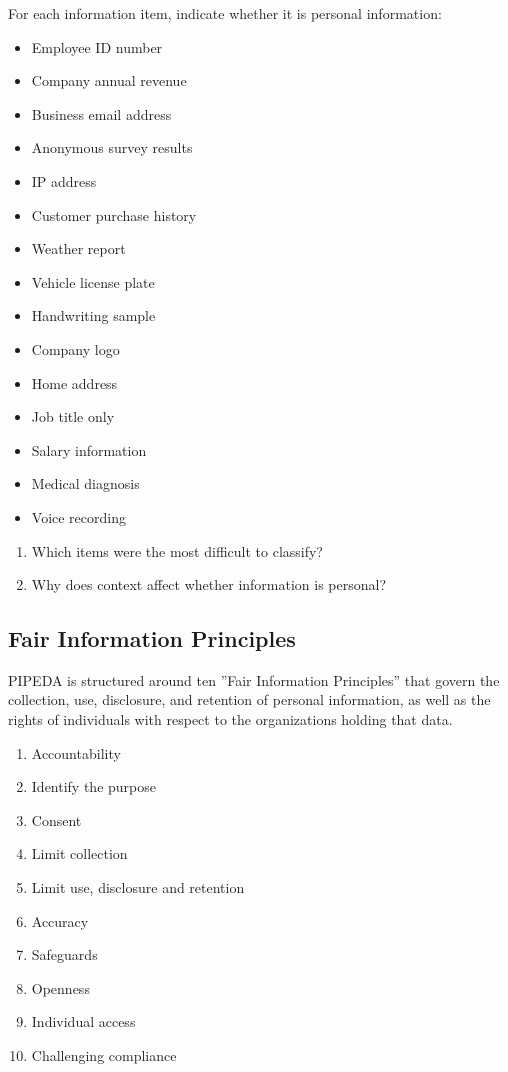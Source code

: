 \begin{exerciseboxpaper}
For each information item, indicate whether it is personal information:
\begin{minipage}[t]{0.54\textwidth}
\begin{itemize}
\item Employee ID number
\item Company annual revenue 
\item Business email address 
\item Anonymous survey results 
\item IP address 
\item Customer purchase history 
\item Weather report 
\item Vehicle license plate 
\end{itemize}
\end{minipage}
\begin{minipage}[t]{0.44\textwidth}
\begin{itemize}
\item Handwriting sample 
\item Company logo 
\item Home address 
\item Job title only 
\item Salary information 
\item Medical diagnosis
\item Voice recording 
\end{itemize}
\end{minipage}
\bigskip
\begin{enumerate}
    \item Which items were the most difficult to classify?
    \item Why does context affect whether information is personal?
\end{enumerate}
\end{exerciseboxpaper}

\subsection*{Fair Information Principles}

PIPEDA is structured around ten ''Fair Information Principles'' that govern the collection, use, disclosure, and retention of personal information, as well as the rights of individuals with respect to the organizations holding that data. 

\begin{enumerate}
   \item Accountability
   \item Identify the purpose
   \item Consent
   \item Limit collection
   \item Limit use, disclosure and retention
   \item Accuracy
   \item Safeguards
   \item Openness
   \item Individual access
   \item Challenging compliance
\end{enumerate}

